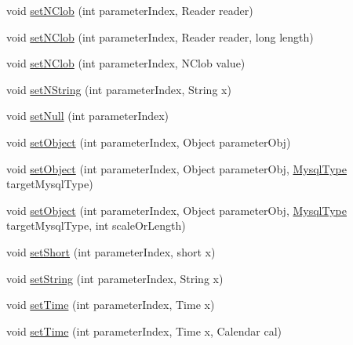 \begin{DoxyCompactItemize}
\item 
void \mbox{\hyperlink{interfacecom_1_1mysql_1_1cj_1_1_query_bindings_a42336834f57b9020ee679888278cfd2d}{set\+N\+Clob}} (int parameter\+Index, Reader reader)
\item 
void \mbox{\hyperlink{interfacecom_1_1mysql_1_1cj_1_1_query_bindings_a4f84dc603e3f63e4b8b3adc3672ea9bf}{set\+N\+Clob}} (int parameter\+Index, Reader reader, long length)
\item 
void \mbox{\hyperlink{interfacecom_1_1mysql_1_1cj_1_1_query_bindings_a64f163d0ed5afff20b74d2cef23754b2}{set\+N\+Clob}} (int parameter\+Index, N\+Clob value)
\item 
void \mbox{\hyperlink{interfacecom_1_1mysql_1_1cj_1_1_query_bindings_a126970d505b9183745100c3daa909e5f}{set\+N\+String}} (int parameter\+Index, String x)
\item 
void \mbox{\hyperlink{interfacecom_1_1mysql_1_1cj_1_1_query_bindings_af1a5be4b4810642f2b13d0123e427161}{set\+Null}} (int parameter\+Index)
\item 
void \mbox{\hyperlink{interfacecom_1_1mysql_1_1cj_1_1_query_bindings_a59506654eef36f22e6852427e623b605}{set\+Object}} (int parameter\+Index, Object parameter\+Obj)
\item 
void \mbox{\hyperlink{interfacecom_1_1mysql_1_1cj_1_1_query_bindings_a32037607b59f8c4a04eb3051763d0f9a}{set\+Object}} (int parameter\+Index, Object parameter\+Obj, \mbox{\hyperlink{enumcom_1_1mysql_1_1cj_1_1_mysql_type}{Mysql\+Type}} target\+Mysql\+Type)
\item 
void \mbox{\hyperlink{interfacecom_1_1mysql_1_1cj_1_1_query_bindings_a41fd893683bfdd90551e4d9726fca0ff}{set\+Object}} (int parameter\+Index, Object parameter\+Obj, \mbox{\hyperlink{enumcom_1_1mysql_1_1cj_1_1_mysql_type}{Mysql\+Type}} target\+Mysql\+Type, int scale\+Or\+Length)
\item 
void \mbox{\hyperlink{interfacecom_1_1mysql_1_1cj_1_1_query_bindings_afcbad5dc3cea800a90ee9d5a42b5dc7d}{set\+Short}} (int parameter\+Index, short x)
\item 
void \mbox{\hyperlink{interfacecom_1_1mysql_1_1cj_1_1_query_bindings_a2a505128503e8f5a305d3a169eaad991}{set\+String}} (int parameter\+Index, String x)
\item 
void \mbox{\hyperlink{interfacecom_1_1mysql_1_1cj_1_1_query_bindings_ad6cc1af81e4a8dd64347af71b027b559}{set\+Time}} (int parameter\+Index, Time x)
\item 
void \mbox{\hyperlink{interfacecom_1_1mysql_1_1cj_1_1_query_bindings_a71543151269616c6e2ba536f4e51d2b7}{set\+Time}} (int parameter\+Index, Time x, Calendar cal)

\end{DoxyCompactItemize}
